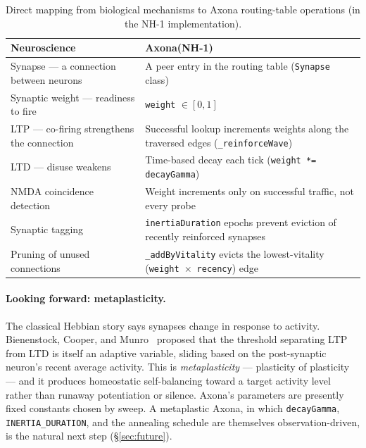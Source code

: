 \documentclass[conference]{IEEEtran}
\newcommand{\axona}{Axona\xspace}
\newcommand{\nhone}{NH-1\xspace}
\begin{document}
\begin{table}[t]
\centering
\caption{Direct mapping from biological mechanisms to \axona routing-table operations (in the \nhone implementation).}
\label{tab:mapping}
\small
\begin{tabular}{@{}p{}p{}@{}}
\toprule
\textbf{Neuroscience} & \textbf{\axona (\nhone)} \\
\midrule
Synapse --- a connection between neurons & A peer entry in the routing table (\texttt{Synapse} class) \\
Synaptic weight --- readiness to fire & \texttt{weight} $\in [0,1]$ \\
LTP --- co-firing strengthens the connection & Successful lookup increments weights along the traversed edges (\texttt{\_reinforceWave}) \\
LTD --- disuse weakens & Time-based decay each tick (\texttt{weight *= decayGamma}) \\
NMDA coincidence detection & Weight increments only on successful traffic, not every probe \\
Synaptic tagging~\cite{frey1997synaptic} & \texttt{inertiaDuration} epochs prevent eviction of recently reinforced synapses \\
Pruning of unused connections & \texttt{\_addByVitality} evicts the lowest-vitality (\texttt{weight}~$\times$~\texttt{recency}) edge \\
\bottomrule
\end{tabular}
\end{table}

\paragraph{Looking forward: metaplasticity.}
The classical Hebbian story says synapses change in response to
activity. Bienenstock, Cooper, and Munro~\cite{bcm1982theory} proposed
that the threshold separating LTP from LTD is itself an adaptive
variable, sliding based on the post-synaptic neuron's recent average
activity. This is \emph{metaplasticity} --- plasticity of plasticity ---
and it produces homeostatic self-balancing toward a target activity
level rather than runaway potentiation or silence. \axona's parameters
are presently fixed constants chosen by sweep. A metaplastic \axona,
in which \texttt{decayGamma}, \texttt{INERTIA\_DURATION}, and the
annealing schedule are themselves observation-driven, is the natural
next step (\S\ref{sec:future}).

\end{document}
